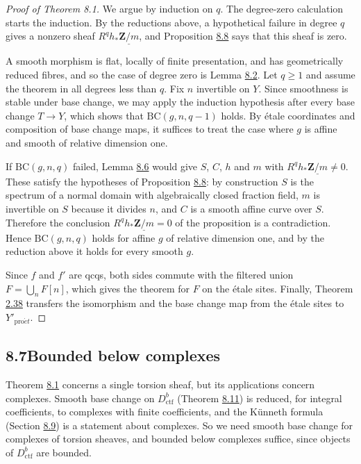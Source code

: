 \documentclass[11pt]{article}
\begin{document}
\begin{proof}[{Proof of Theorem 8.1}]\label{bp671}%
We argue by induction on \(q\). The degree-zero calculation starts the induction. By the reductions above, a hypothetical failure in degree \(q\) gives a nonzero sheaf \(R^qh_*\underline{\mathbf Z/m}\), and Proposition \hyperref[bp668]{8.8} says that this sheaf is zero.

A smooth morphism is flat, locally of finite presentation, and has geometrically reduced fibres, and so the case of degree zero is Lemma \hyperref[bp647]{8.2}. Let \(q\geq1\) and assume the theorem in all degrees less than \(q\). Fix \(n\) invertible on \(Y\). Since smoothness is stable under base change, we may apply the induction hypothesis after every base change \(T\to Y\), which shows that \(\mathrm{BC}(g,n,q-1)\) holds. By étale coordinates and composition of base change maps, it suffices to treat the case where \(g\) is affine and smooth of relative dimension one.

If \(\mathrm{BC}(g,n,q)\) failed, Lemma \hyperref[bp662]{8.6} would give \(S\), \(C\), \(h\) and \(m\) with \(R^qh_*\underline{\mathbf Z/m}\neq0\). These satisfy the hypotheses of Proposition \hyperref[bp668]{8.8}: by construction \(S\) is the spectrum of a normal domain with algebraically closed fraction field, \(m\) is invertible on \(S\) because it divides \(n\), and \(C\) is a smooth affine curve over \(S\). Therefore the conclusion \(R^qh_*\underline{\mathbf Z/m}=0\) of the proposition is a contradiction. Hence \(\mathrm{BC}(g,n,q)\) holds for affine \(g\) of relative dimension one, and by the reduction above it holds for every smooth \(g\).

Since \(f\) and \(f'\) are qcqs, both sides commute with the filtered union \(F=\bigcup_nF[n]\), which gives the theorem for \(F\) on the étale sites. Finally, Theorem \hyperref[bp113]{2.38} transfers the isomorphism and the base change map from the étale sites to \(Y'_{\mathrm{pro}\acute{e}t}\).
\end{proof}


\subsection*{\texorpdfstring{8.7\quad Bounded below complexes}{8.7 Bounded below complexes}}
\label{bp672}%
\label{bp673}%
Theorem \hyperref[bp643]{8.1} concerns a single torsion sheaf, but its applications concern complexes. Smooth base change on \(D^b_{\mathrm{ctf}}\) (Theorem \hyperref[bp681]{8.11}) is reduced, for integral coefficients, to complexes with finite coefficients, and the Künneth formula (Section \hyperref[bp685]{8.9}) is a statement about complexes. So we need smooth base change for complexes of torsion sheaves, and bounded below complexes suffice, since objects of \(D^b_{\mathrm{ctf}}\) are bounded.
\end{document}
